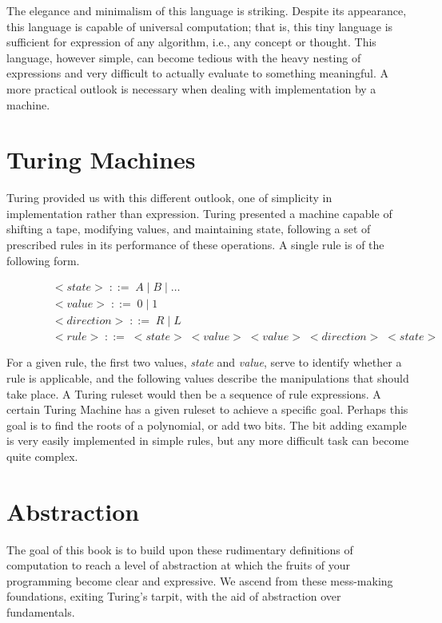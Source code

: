 The elegance and minimalism of this language is striking. Despite its appearance, 
this language is capable of universal computation; that is, this tiny language is 
sufficient for expression of any algorithm, i.e., any concept or thought. This 
language, however simple, can become tedious with the heavy nesting of expressions 
and very difficult to actually evaluate to something meaningful. A more practical 
outlook is necessary when dealing with implementation by a machine.

\section{Turing Machines}
Turing provided us with this different outlook, one of simplicity in 
implementation rather than expression. Turing presented a machine capable of 
shifting a tape, modifying values, and maintaining state, following a set of 
prescribed rules in its performance of these operations. A single rule is of the 
following form.

\begin{figure}[ht]
\caption{}\label{}
\begin{align*}
& <state> \; ::= \; A \; | \; B \; | \; \dots
\\& <value> \; ::= \; 0 \; | \; 1
\\& <direction> \; ::= \; R \; | \; L
\\& <rule> \; ::= \; <state> \; <value> \; <value> \; <direction> \; <state>
\end{align*}
\end{figure}

For a given rule, the first two values, \emph{state} and \emph{value}, serve to identify 
whether a rule is applicable, and the following values describe the manipulations 
that should take place. A Turing ruleset would then be a sequence of rule 
expressions. A certain Turing Machine has a given ruleset to achieve a specific 
goal. Perhaps this goal is to find the roots of a polynomial, or add two bits. The 
bit adding example is very easily implemented in simple rules, but any more 
difficult task can become quite complex.

\section{Abstraction}
The goal of this book is to build upon these rudimentary definitions of 
computation to reach a level of abstraction at which the fruits of your 
programming become clear and expressive. We ascend from these mess-making 
foundations, exiting Turing's tarpit, with the aid of abstraction over 
fundamentals.

